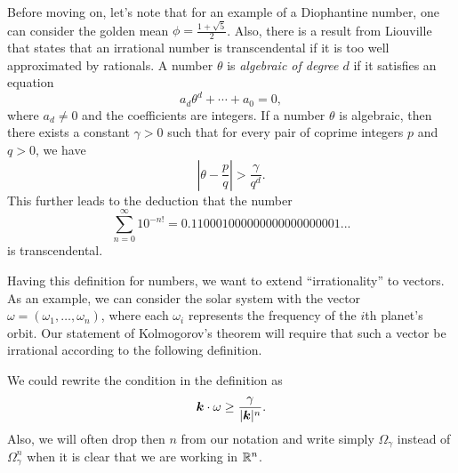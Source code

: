\documentclass[twoside,letterpaper,11pt]{article}
\numberwithin{equation}{section}
\begin{document}
Before moving on, let's note that for an example of a Diophantine number, one
can consider the golden mean $\phi = \frac{1 + \sqrt{5}}{2}$.
Also, there is a result from Liouville that states that an irrational number is
transcendental if it is too well approximated by rationals.
A number $\theta$ is \emph{algebraic of degree $d$} if it satisfies an equation
\begin{equation*}
  a_d \theta^d + \cdots + a_0 = 0,
\end{equation*}
where $a_d \neq 0$ and the coefficients are integers.
If a number $\theta$ is algebraic, then there exists a constant $\gamma > 0$
such that for every pair of coprime integers $p$ and $q > 0$, we have
\begin{equation*}
  \left| \theta - \frac{p}{q} \right| > \frac{\gamma}{q^d}.
\end{equation*}
This further leads to the deduction that the number
\begin{equation*}
  \sum_{n=0}^{\infty} 10^{-n!} = 0.110001000000000000000001...
\end{equation*}
is transcendental.

Having this definition for numbers, we want to extend ``irrationality'' to
vectors.
As an example, we can consider the solar system with the vector $\omega =
(\omega_1, \ldots, \omega_n)$, where each $\omega_i$ represents the frequency of
the $i$th planet's orbit.
Our statement of Kolmogorov's theorem will require that such a vector be
irrational according to the following definition.
\begin{defn}
  \label{def:diovec}
  \diovector{}
\end{defn}
We could rewrite the condition in the definition as
\begin{equation}
  \label{eq:diovec}
  \bm{k} \cdot \omega \geq \frac{\gamma}{|\bm{k}|^n}.
\end{equation}
Also, we will often drop then $n$ from our notation and write simply
$\Omega_{\gamma}$ instead of $\Omega_{\gamma}^n$ when it is clear that we are
working in $\mathbb{R}^n$.
\end{document}
